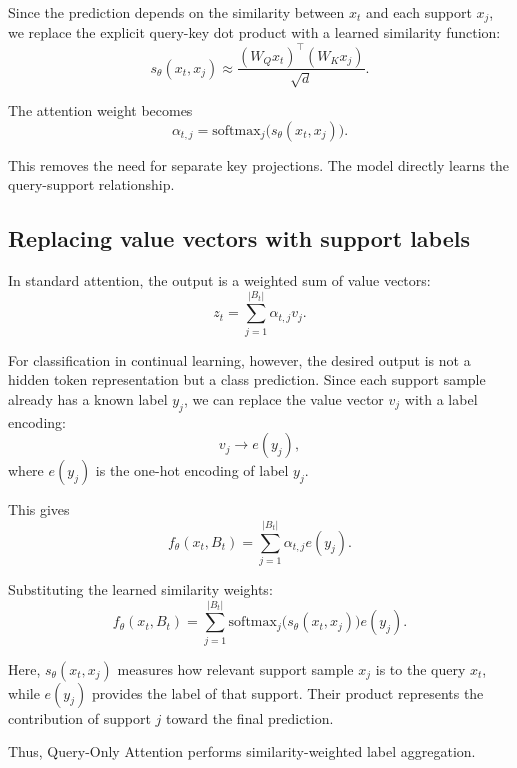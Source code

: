 \documentclass{article}
\begin{document}
Since the prediction depends on the similarity between $x_t$ and each support $x_j$, we replace the explicit query-key dot product with a learned similarity function:
\begin{equation}
s_\theta(x_t,x_j)
\approx
\frac{(W_Q x_t)^\top (W_K x_j)}{\sqrt{d}}.
\end{equation}

The attention weight becomes
\begin{equation}
\alpha_{t,j}
=
\mathrm{softmax}_j \big(s_\theta(x_t,x_j)\big).
\end{equation}

This removes the need for separate key projections. The model directly learns the query-support relationship.

\subsection{Replacing value vectors with support labels}

In standard attention, the output is a weighted sum of value vectors:
\begin{equation}
z_t = \sum_{j=1}^{|B_t|} \alpha_{t,j} v_j.
\end{equation}

For classification in continual learning, however, the desired output is not a hidden token representation but a class prediction. Since each support sample already has a known label $y_j$, we can replace the value vector $v_j$ with a label encoding:
\begin{equation}
v_j \rightarrow e(y_j),
\end{equation}
where $e(y_j)$ is the one-hot encoding of label $y_j$.

This gives
\begin{equation}
f_\theta(x_t,B_t)
=
\sum_{j=1}^{|B_t|}
\alpha_{t,j} e(y_j).
\end{equation}

Substituting the learned similarity weights:
\begin{equation}
f_\theta(x_t,B_t)
=
\sum_{j=1}^{|B_t|}
\mathrm{softmax}_j\big(s_\theta(x_t,x_j)\big)
e(y_j).
\end{equation}

Here, $s_\theta(x_t,x_j)$ measures how relevant support sample $x_j$ is to the query $x_t$, while $e(y_j)$ provides the label of that support. Their product represents the contribution of support $j$ toward the final prediction.

Thus, Query-Only Attention performs similarity-weighted label aggregation.
\end{document}
